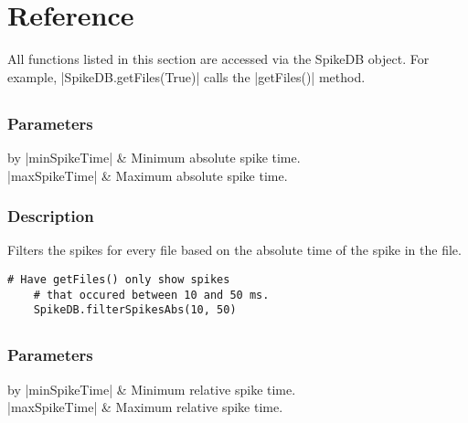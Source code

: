 \documentclass{report}
\begin{document}
\section{Reference}
All functions listed in this section are accessed via the SpikeDB object.  For example, |SpikeDB.getFiles(True)| calls the |getFiles()| method.

\clearpage
\subsection{}
\subsubsection{Parameters}
\begin{center}
\begin{tabular}{by}
	|minSpikeTime| & Minimum absolute spike time.\\
	|maxSpikeTime| & Maximum absolute spike time.\\
\end{tabular}
\end{center}
\subsubsection{Description}
Filters the spikes for every file based on the absolute time of the spike in the file.
\begin{lstlisting}[caption=Example]
	# Have getFiles() only show spikes 
	# that occured between 10 and 50 ms.
	SpikeDB.filterSpikesAbs(10, 50)
\end{lstlisting}

\clearpage
\subsection{}
\subsubsection{Parameters}
\begin{table}[h]
\begin{center}
\begin{tabular}{by}
		|minSpikeTime| & Minimum relative spike time.\\
		|maxSpikeTime| & Maximum relative spike time.\\
	\end{tabular}
\end{center}
\end{table}
\end{document}
